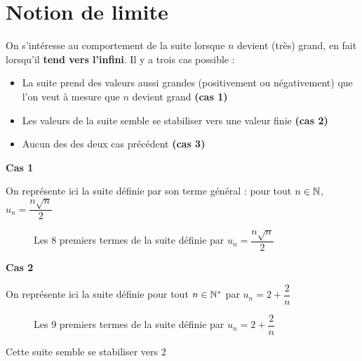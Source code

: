 \section{Notion de limite}
On s'intéresse au comportement de la suite lorsque $n$ devient (très) grand, en fait lorsqu'il \textbf{tend vers l'infini}. Il y a trois cas possible : 
\begin{itemize}
\item La suite prend des valeurs aussi grandes (positivement ou négativement) que l'on veut à mesure que $n$ devient grand \textbf{(cas 1)}
\item Les valeurs de la suite semble se stabiliser vers une valeur finie \textbf{(cas 2)}
\item Aucun des des deux cas précédent \textbf{(cas 3)}
\end{itemize}
\begin{exemples}
\textbf{Cas 1}\newline

On représente ici la suite définie par son terme général : pour tout $n\in\mathbb{N}$, $u_n = \dfrac{n\sqrt{n}}{2}$\newline

\begin{figure}[H]
\centering
{}
\caption{Les 8 premiers termes de la suite définie par $u_n = \dfrac{n\sqrt{n}}{2}$}
\end{figure}


\textbf{Cas 2}\newline

On représente ici la suite définie pour tout $n\in\mathbb{N}^*$ par $u_n = 2+\dfrac{2}{n}$

\begin{figure}[H]
\centering
{}
\caption{Les 9 premiers termes de la suite définie par $u_n = 2+\dfrac{2}{n}$}
\end{figure}
Cette suite semble se stabiliser vers 2\newline


\end{exemples}

